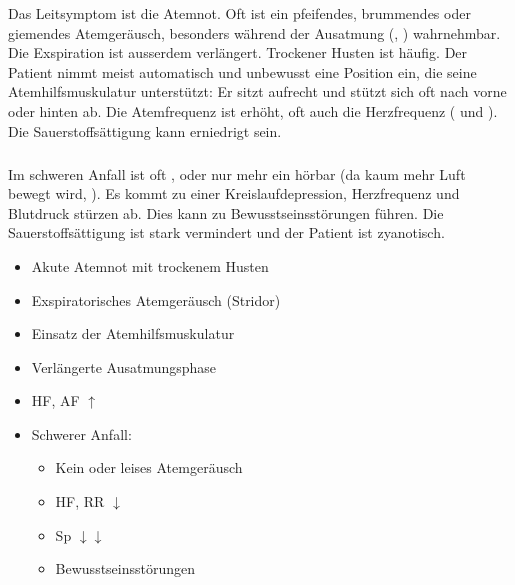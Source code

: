{%
Das Leitsymptom ist die Atemnot. Oft ist ein pfeifendes,
brummendes oder giemendes Atemgeräusch, besonders während
der Ausatmung (, ) wahrnehmbar. Die Exspiration ist ausserdem
verlängert. Trockener Husten ist häufig.
Der Patient nimmt meist automatisch und unbewusst eine
Position ein, die seine Atemhilfsmuskulatur unterstützt: Er
sitzt aufrecht und stützt sich oft nach vorne oder hinten
ab.
Die Atemfrequenz ist erhöht, oft auch die Herzfrequenz
( und ). Die Sauerstoffsättigung
kann erniedrigt sein.



\subparagraph{}

Im schweren Anfall ist oft , oder nur mehr ein
 hörbar (da kaum mehr Luft bewegt
wird, ). Es kommt zu einer
Kreislaufdepression, Herzfrequenz und Blutdruck stürzen ab.
Dies kann zu Bewusstseinsstörungen führen. Die
Sauerstoffsättigung ist stark vermindert und der Patient ist
zyanotisch.


}{
\begin{itemize}
  \item Akute Atemnot mit trockenem Husten
  \item Exspiratorisches Atemgeräusch (Stridor)
  \item Einsatz der Atemhilfsmuskulatur
  \item Verlängerte Ausatmungsphase
  \item HF, AF $\uparrow$
  \item Schwerer Anfall:
  \begin{itemize}
    \item Kein oder leises Atemgeräusch
    \item HF, RR $\downarrow$
    \item Sp $\downarrow\downarrow$
    \item Bewusstseinsstörungen
  \end{itemize}
\end{itemize}
}
{}
{}
{}

